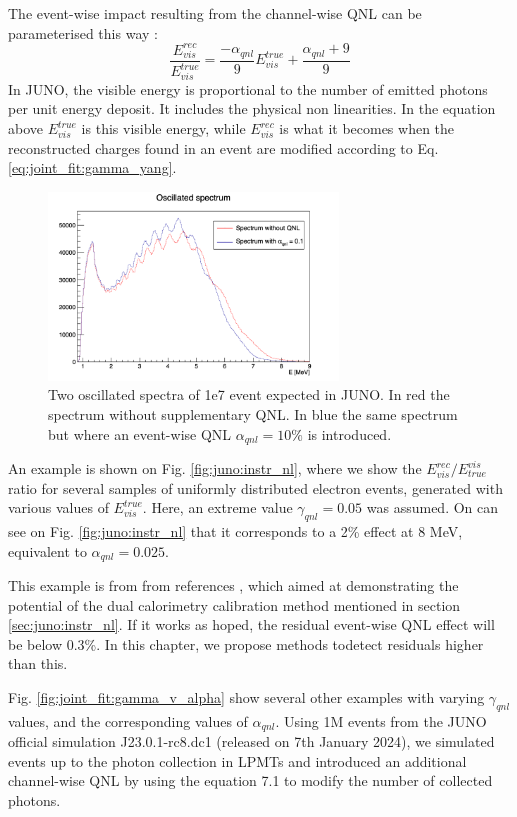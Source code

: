 \documentclass[../main.tex]{subfiles}
\begin{document}
The event-wise impact resulting from the channel-wise QNL can be parameterised this way :
\begin{equation}
  \label{eq:joint_fit:alpha_yang}
  \frac{E^{rec}_{vis}}{E^{true}_{vis}} = \frac{-\alpha_{qnl}}{9} E^{true}_{vis} + \frac{\alpha_{qnl} + 9}{9}
\end{equation}
In JUNO, the visible energy is proportional to the number of emitted photons per unit energy deposit. It includes the physical non linearities.
In the equation above $E_{vis}^{true}$ is this visible energy, while $E_{vis}^{rec}$ is what it becomes when the reconstructed charges found in an event are modified according to Eq. \ref{eq:joint_fit:gamma_yang}.

\begin{figure}[ht]
  \centering
  \includegraphics[height=5cm]{images/joint_fit/spectrums.png}
  \caption{Two oscillated spectra of 1e7 event expected in JUNO. In red the spectrum without supplementary QNL. In blue the same spectrum but where an event-wise QNL $\alpha_{qnl} = 10\%$ is introduced.}
  \label{fig:joint_fit:spectrums_comp}
\end{figure}


An example is shown on Fig. \ref{fig:juno:instr_nl}, where we show the $E^{rec}_{vis}/E_{true}^{vis}$ ratio for several samples of uniformly distributed electron events, generated with various values of $E_{vis}^{true}$.
Here, an extreme value $\gamma_{qnl}=0.05$ was assumed. On can see on Fig. \ref{fig:juno:instr_nl} that it corresponds to a 2\% effect at 8 MeV, equivalent to $\alpha_{qnl} = 0.025$.

This example is from  from references \cite{han_dual_2021}, which aimed at demonstrating the potential of the dual calorimetry calibration method mentioned in section
\ref{sec:juno:instr_nl}. If it works as hoped, the residual event-wise QNL effect will be below 0.3\%. In this chapter, we propose methods todetect residuals higher than this.

Fig. \ref{fig:joint_fit:gamma_v_alpha} show several other examples with varying $\gamma_{qnl}$ values, and
the corresponding values of $\alpha_{qnl}$.
Using 1M events from the JUNO official simulation J23.0.1-rc8.dc1 (released on 7th January 2024), we
simulated events up to the photon collection in LPMTs and introduced an additional channel-wise
QNL by using the equation 7.1 to modify the number of collected photons.
\end{document}
